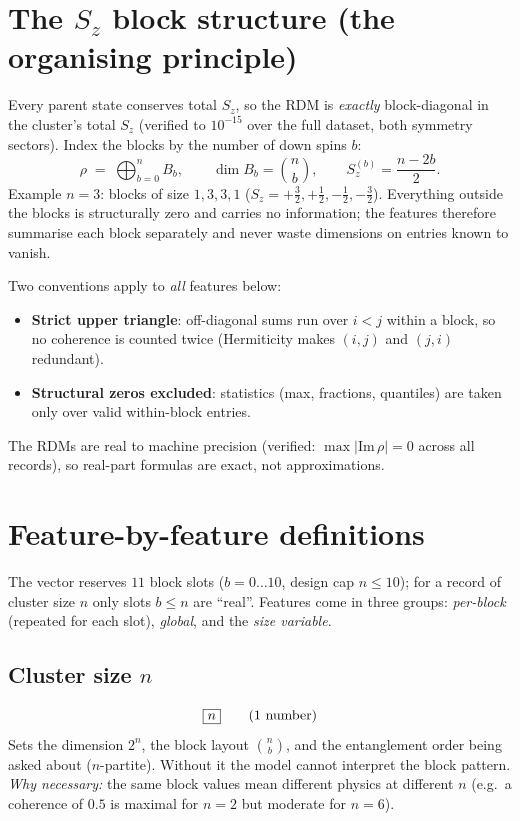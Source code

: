 \documentclass[11pt]{article}
\newcommand{\Bb}{\ensuremath{B_b}}
\begin{document}
\section{The $S_z$ block structure (the organising principle)}
Every parent state conserves total $S_z$, so the RDM is \emph{exactly}
block-diagonal in the cluster's total $S_z$ (verified to $10^{-15}$ over the
full dataset, both symmetry sectors). Index the blocks by the number of down
spins $b$:
\[
  \rho \;=\; \bigoplus_{b=0}^{n} \Bb ,
  \qquad
  \dim \Bb = \binom{n}{b},
  \qquad
  S_z^{(b)} = \frac{n-2b}{2} .
\]
Example $n=3$: blocks of size $1,3,3,1$ ($S_z=+\tfrac32,+\tfrac12,
-\tfrac12,-\tfrac32$). Everything outside the blocks is structurally zero
and carries no information; the features therefore summarise each block
separately and never waste dimensions on entries known to vanish.

Two conventions apply to \emph{all} features below:
\begin{itemize}[nosep]
  \item \textbf{Strict upper triangle}: off-diagonal sums run over $i<j$
        within a block, so no coherence is counted twice (Hermiticity makes
        $(i,j)$ and $(j,i)$ redundant).
  \item \textbf{Structural zeros excluded}: statistics (max, fractions,
        quantiles) are taken only over valid within-block entries.
\end{itemize}
The RDMs are real to machine precision (verified: $\max|\mathrm{Im}\,\rho|=0$
across all records), so real-part formulas are exact, not approximations.

\section{Feature-by-feature definitions}\label{sec:features}
The vector reserves $11$ block slots ($b=0\ldots10$, design cap $n\le10$);
for a record of cluster size $n$ only slots $b\le n$ are ``real''. Features
come in three groups: \emph{per-block} (repeated for each slot),
\emph{global}, and the \emph{size variable}.

\subsection{Cluster size $n$}
\[
  \fbox{$n$}\qquad\text{(1 number)}
\]
Sets the dimension $2^n$, the block layout $\binom{n}{b}$, and the
entanglement order being asked about ($n$-partite). Without it the model
cannot interpret the block pattern. \emph{Why necessary:} the same block
values mean different physics at different $n$ (e.g.\ a coherence of $0.5$
is maximal for $n=2$ but moderate for $n=6$).
\end{document}

